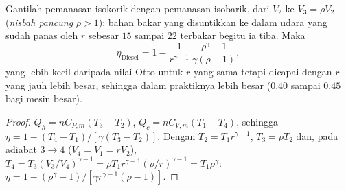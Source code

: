 \begin{proposition}\label{prop:b1:heat-engines:diesel}
Gantilah pemanasan isokorik  dengan pemanasan isobarik, dari
$V_2$ ke $V_3 = \rho V_2$ (\emph{nisbah pancung} $\rho > 1$): bahan bakar yang disuntikkan
ke dalam udara yang sudah panas oleh  $r$ sebesar $15$ sampai $22$ terbakar
begitu ia tiba. Maka
\[
\eta_{\text{Diesel}} = 1 - \frac{1}{r^{\gamma-1}}\,\frac{\rho^{\gamma} - 1}{\gamma(\rho - 1)} ,
\]
yang lebih kecil daripada nilai Otto untuk $r$ yang sama tetapi dicapai dengan $r$ yang jauh
lebih besar, sehingga dalam praktiknya lebih besar ($0.40$ sampai $0.45$ bagi mesin besar).
\end{proposition}

\begin{proof}
$Q_h = nC_{P,m}(T_3 - T_2)$, $Q_c = nC_{V,m}(T_1 - T_4)$, sehingga $\eta = 1 -
(T_4 - T_1)/[\gamma(T_3 - T_2)]$. Dengan $T_2 = T_1r^{\gamma-1}$, $T_3 =
\rho T_2$ dan, pada adiabat $3 \to 4$ ($V_4 = V_1 = rV_2$), $T_4 =
T_3(V_3/V_4)^{\gamma-1} = \rho T_1 r^{\gamma-1}(\rho/r)^{\gamma-1} = T_1\rho^{\gamma}$:
$\eta = 1 - (\rho^\gamma - 1)/[\gamma r^{\gamma-1}(\rho - 1)]$.
\end{proof}

